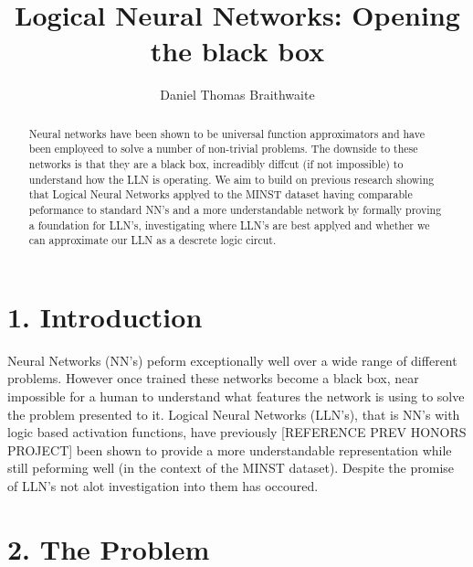 \documentclass[11pt, a4paper, twoside, openright]{report}
\title{Logical Neural Networks: Opening the black box}
\author{Daniel Thomas Braithwaite}
\date{}
\begin{document}
\frontmatter


\begin{abstract}
Neural networks have been shown to be universal function approximators  and have been employeed to solve a number of non-trivial problems. The downside to these networks is that they are a black box, increadibly diffcut (if not impossible) to understand how the LLN is operating. We aim to build on previous research showing that Logical Neural Networks applyed to the MINST dataset having comparable peformance to standard NN's and a more understandable network by formally proving a foundation for LLN's, investigating where LLN's are best applyed and whether we can approximate our LLN as a descrete logic circut.
\end{abstract}


\maketitle




\mainmatter


\section*{1. Introduction}

Neural Networks (NN's) peform exceptionally well over a wide range of different problems. However once trained these networks become a black box, near impossible for a human to understand what features the network is using to solve the problem presented to it. Logical Neural Networks (LLN's), that is NN's with logic based activation functions, have previously [REFERENCE PREV HONORS PROJECT] been shown to provide a more understandable representation while still peforming well (in the context of the MINST dataset). Despite the promise of LLN's not alot investigation into them has occoured.

\section*{2. The Problem}
\end{document}

